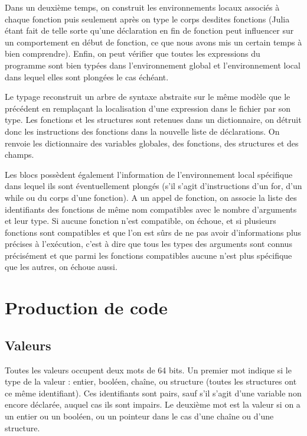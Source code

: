 \documentclass[10pt,a4paper]{article}
\begin{document}
Dans un deuxième temps, on construit les environnements locaux associés à chaque
fonction puis seulement après on type le corps desdites fonctions (Julia étant fait de
telle sorte qu'une déclaration en fin de fonction peut influencer sur un comportement
en début de fonction, ce que nous avons mis un certain temps à bien comprendre).
Enfin, on peut vérifier que toutes les expressions du programme sont bien typées dans
l'environnement global et l'environnement local dans lequel elles sont plongées le cas
échéant.
\newline

Le typage reconstruit un arbre de syntaxe abstraite sur le même modèle que le précédent en remplaçant la localisation d'une expression dans le fichier par son type. Les fonctions et les structures sont retenues dans un dictionnaire, on détruit donc les instructions des fonctions dans la nouvelle liste de déclarations. On renvoie les dictionnaire des variables globales, des fonctions, des structures et des champs.

Les blocs possèdent également l'information de l'environnement local spécifique dans lequel ils sont éventuellement plongés (s'il s'agit d'instructions d'un for, d'un while ou du corps d'une fonction). A un appel de fonction, on associe la liste des identifiants des fonctions de même nom compatibles avec le nombre d'arguments et leur type. Si aucune fonction n'est compatible, on échoue, et si plusieurs fonctions sont compatibles et que l'on est sûrs de ne pas avoir d'informations plus précises à l'exécution, c'est à dire que tous les types des arguments sont connus précisément et que parmi les fonctions compatibles aucune n'est plus spécifique que les autres, on échoue aussi.

\section{Production de code}
\subsection{Valeurs}
Toutes les valeurs occupent deux mots de 64 bits. Un premier mot indique si le type de la valeur : entier, booléen, chaîne, ou structure (toutes les structures ont ce même identifiant). Ces identifiants sont pairs, sauf s'il s'agit d'une variable non encore déclarée, auquel cas ils sont impairs. Le deuxième mot est la valeur si on a un entier ou un booléen, ou un pointeur dans le cas d'une chaîne ou d'une structure. 
\end{document}
